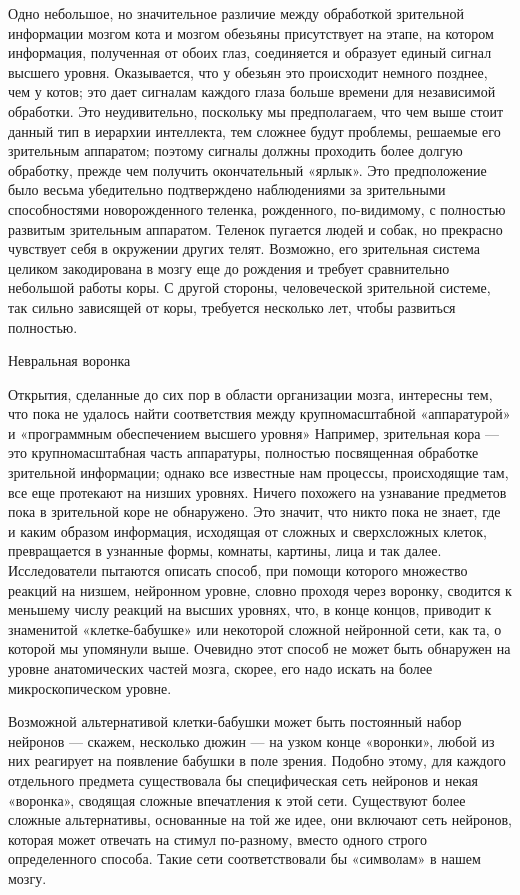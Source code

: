 \documentclass[../main.tex]{subfiles}
\begin{document}
Одно небольшое, но значительное различие между обработкой зрительной информации мозгом кота и мозгом обезьяны присутствует на этапе, на котором информация, полученная от обоих глаз, соединяется и образует единый сигнал высшего уровня. Оказывается, что у обезьян это происходит немного позднее, чем у котов; это дает сигналам каждого глаза больше времени для независимой обработки. Это неудивительно, поскольку мы предполагаем, что чем выше стоит данный тип в иерархии интеллекта, тем сложнее будут проблемы, решаемые его зрительным аппаратом; поэтому сигналы должны проходить более долгую обработку, прежде чем получить окончательный «ярлык». Это предположение было весьма убедительно подтверждено наблюдениями за зрительными способностями новорожденного теленка, рожденного, по-видимому, с полностью развитым зрительным аппаратом. Теленок пугается людей и собак, но прекрасно чувствует себя в окружении других телят. Возможно, его зрительная система целиком закодирована в мозгу еще до рождения и требует сравнительно небольшой работы коры. С другой стороны, человеческой зрительной системе, так сильно зависящей от коры, требуется несколько лет, чтобы развиться полностью.

Невральная воронка

Открытия, сделанные до сих пор в области организации мозга, интересны тем, что пока не удалось найти соответствия между крупномасштабной «аппаратурой» и «программным обеспечением высшего уровня» Например, зрительная кора --- это крупномасштабная часть аппаратуры, полностью посвященная обработке зрительной информации; однако все известные нам процессы, происходящие там, все еще протекают на низших уровнях. Ничего похожего на узнавание предметов пока в зрительной коре не обнаружено. Это значит, что никто пока не знает, где и каким образом информация, исходящая от сложных и сверхсложных клеток, превращается в узнанные формы, комнаты, картины, лица и так далее. Исследователи пытаются описать способ, при помощи которого множество реакций на низшем, нейронном уровне, словно проходя через воронку, сводится к меньшему числу реакций на высших уровнях, что, в конце концов, приводит к знаменитой «клетке-бабушке» или некоторой сложной нейронной сети, как та, о которой мы упомянули выше. Очевидно этот способ не может быть обнаружен на уровне анатомических частей мозга, скорее, его надо искать на более микроскопическом уровне.

Возможной альтернативой клетки-бабушки может быть постоянный набор нейронов --- скажем, несколько дюжин --- на узком конце «воронки», любой из них реагирует на появление бабушки в поле зрения. Подобно этому, для каждого отдельного предмета существовала бы специфическая сеть нейронов и некая «воронка», сводящая сложные впечатления к этой сети. Существуют более сложные альтернативы, основанные на той же идее, они включают сеть нейронов, которая может отвечать на стимул по-разному, вместо одного строго определенного способа. Такие сети соответствовали бы «символам» в нашем мозгу.
\end{document}
